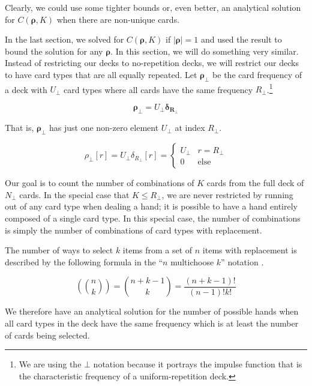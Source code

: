 \documentclass{article}
\begin{document}
Clearly, we could use some tighter bounds or, even better, an analytical solution for $C(\bm{\rho}, K)$ when there are non-unique cards.


In the last section, we solved for $C(\bm{\rho}, K)$ if $\lvert \bm{\rho} \rvert=1$ and used the result to bound the solution for any $\bm{\rho}$. In this section, we will do something very similar. Instead of restricting our decks to no-repetition decks, we will restrict our decks to have card types that are all equally repeated. Let $\bm{\rho_\bot}$ be the card frequency of a deck with $U_\bot$ card types where all cards have the same frequency $R_\bot$.\footnote{We are using the $\bot$ notation because it portrays the impulse function that is the characteristic frequency of a uniform-repetition deck.}

\begin{equation}
    \bm{\rho_{\bot}} = U_{\bot} \bm{\delta_{R_{\bot}}}
\end{equation}

That is, $\bm{\rho_{\bot}}$ has just one non-zero element $U_\bot$ at index $R_{\bot}$.

\begin{equation}
    \rho_{\bot}[r] = U_{\bot} \delta_{R_{\bot}}[r] = \begin{cases} U_{\bot} & r=R_{\bot} \\ 0 & \text{else}
    \end{cases}
\end{equation}

Our goal is to count the number of combinations of $K$ cards from the full deck of $N_{\bot}$ cards. In the special case that $K\leq R_\bot$, we are never restricted by running out of any card type when dealing a hand; it is possible to have a hand entirely composed of a single card type. In this special case, the number of combinations is simply the number of combinations of card types with replacement.

The number of ways to select $k$ items from a set of $n$ items with replacement is described by the following formula in the ``$n$ multichoose $k$'' notation \cite{benjamin_quinn_2003}.

\begin{equation}
    \left (\binom{n}{k}\right) = \binom{n + k - 1}{k} = \frac{(n + k - 1)!}{(n - 1)!k!}
\end{equation}

We therefore have an analytical solution for the number of possible hands when all card types in the deck have the same frequency which is at least the number of cards being selected.
\end{document}
